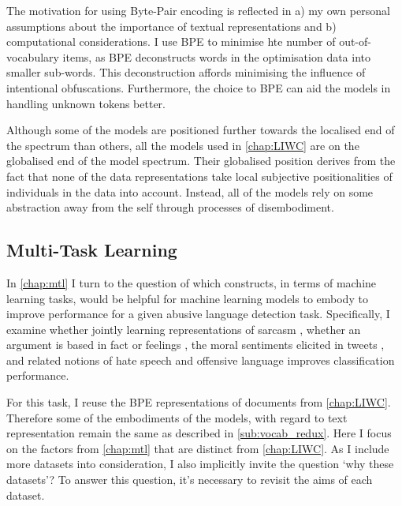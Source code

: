{The motivation for using Byte-Pair encoding is reflected in a) my own personal assumptions about the importance of textual representations and b) computational considerations.
I use BPE to minimise hte number of out-of-vocabulary items, as BPE deconstructs words in the optimisation data into smaller sub-words.
This deconstruction affords minimising the influence of intentional obfuscations.
Furthermore, the choice to BPE can aid the models in handling unknown tokens better.

Although some of the models are positioned further towards the localised end of the spectrum than others, all the models used in \cref{chap:LIWC} are on the globalised end of the model spectrum.
Their globalised position derives from the fact that none of the data representations take local subjective positionalities of individuals in the data into account.
Instead, all of the models rely on some abstraction away from the self through processes of disembodiment.

\subsection{Multi-Task Learning}\label{sub:mtl_inchap}
In \autoref{chap:mtl} I turn to the question of which constructs, in terms of machine learning tasks, would be helpful for machine learning models to embody to improve performance for a given abusive language detection task.
Specifically, I examine whether jointly learning representations of sarcasm \citep{Oraby_sarcasm:2016}, whether an argument is based in fact or feelings \citep{Oraby_factfeel:2015}, the moral sentiments elicited in tweets \citep{Hoover:2019}, and related notions of hate speech and offensive language \citep{Waseem:2016,Waseem-Hovy:2016,Davidson:2017,Wulczyn:2016} improves classification performance.

For this task, I reuse the BPE representations of documents from \autoref{chap:LIWC}.
Therefore some of the embodiments of the models, with regard to text representation remain the same as described in \cref{sub:vocab_redux}.
Here I focus on the factors from \cref{chap:mtl} that are distinct from \cref{chap:LIWC}.
As I include more datasets into consideration, I also implicitly invite the question `why these datasets'?
To answer this question, it's necessary to revisit the aims of each dataset.

}
